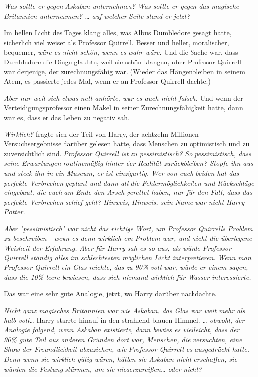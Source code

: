 {\emph{Was sollte er gegen Askaban unternehmen? Was sollte er gegen das magische Britannien unternehmen? … auf welcher Seite stand er jetzt?}

Im hellen Licht des Tages klang alles, was Albus Dumbledore gesagt hatte, sicherlich viel weiser als Professor Quirrell. Besser und heller, moralischer, bequemer, \emph{wäre es nicht schön, wenn es wahr wäre.} Und die Sache war, dass Dumbledore die Dinge glaubte, weil sie schön klangen, aber Professor Quirrell war derjenige, der zurechnungsfähig war. (Wieder das Hängenbleiben in seinem Atem, es passierte jedes Mal, wenn er an Professor Quirrell dachte.)

\emph{Aber nur weil sich etwas nett anhörte, war es auch nicht falsch.} Und wenn der Verteidigungsprofessor einen Makel in seiner Zurechnungsfähigkeit hatte, dann war es, dass er das Leben zu negativ sah.

\emph{Wirklich?} fragte sich der Teil von Harry, der achtzehn Millionen Versuchsergebnisse darüber gelesen hatte, dass Menschen zu optimistisch und zu zuversichtlich sind. \emph{Professor Quirrell ist zu pessimistisch? So pessimistisch, dass seine Erwartungen routinemäßig hinter der Realität zurückbleiben? Stopfe ihn aus und steck ihn in ein Museum, er ist einzigartig. Wer von euch beiden hat das perfekte Verbrechen geplant und dann all die Fehlermöglichkeiten und Rückschläge eingebaut, die euch am Ende den Arsch gerettet haben, nur für den Fall, dass das perfekte Verbrechen schief geht? Hinweis, Hinweis, sein Name war nicht Harry Potter.}

\emph{Aber "pessimistisch" war nicht das richtige Wort, um Professor Quirrells Problem zu beschreiben - wenn es denn wirklich ein Problem war, und nicht die überlegene Weisheit der Erfahrung.} \emph{Aber für Harry sah es so aus, als würde Professor Quirrell ständig alles im schlechtesten möglichen Licht interpretieren.} \emph{Wenn man Professor Quirrell ein Glas reichte, das zu 90\% voll war, würde er einem sagen, dass die 10\% leere bewiesen, dass sich niemand wirklich für Wasser interessierte.}

Das war eine sehr gute Analogie, jetzt, wo Harry darüber nachdachte.

\emph{Nicht ganz magisches Britannien war wie Askaban, das Glas war weit mehr als halb voll…} Harry starrte hinauf in den strahlend blauen Himmel. \emph{… obwohl, der Analogie folgend, wenn Askaban existierte, dann bewies es vielleicht, dass der 90\% gute Teil aus anderen Gründen dort war, Menschen, die versuchten, eine Show der Freundlichkeit abzuziehen, wie Professor Quirrell es ausgedrückt hatte. Denn wenn sie wirklich gütig wären, hätten sie Askaban nicht erschaffen, sie würden die Festung stürmen, um sie niederzureißen… oder nicht?}

}
